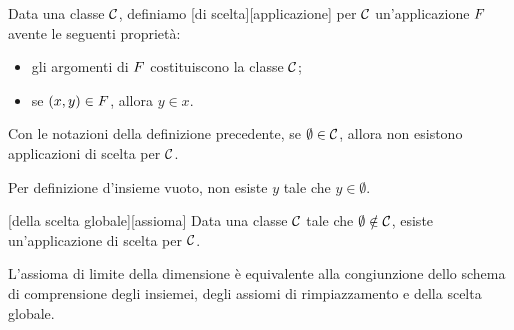 \begin{Definition}
	Data una classe $\mathcal{C}$, definiamo [di scelta][applicazione] per $\mathcal{C}$ un'applicazione $F$ avente le seguenti propriet\`a:
	\begin{itemize}
		\item gli argomenti di $F$ costituiscono la classe $\mathcal{C}$;
		\item se $(x,y) \in F$, allora $y \in x$.
	\end{itemize}
\end{Definition}
\begin{Theorem}
	Con le notazioni della definizione precedente, se $\emptyset \in \mathcal{C}$, allora non esistono applicazioni di scelta per $\mathcal{C}$.
\end{Theorem}
\Proof Per definizione d'insieme vuoto, non esiste $y$ tale che $y \in \emptyset$. \EndProof
\begin{Axiom}
	[della scelta globale][assioma] Data una classe $\mathcal{C}$ tale che $\emptyset \notin \mathcal{C}$, esiste un'applicazione di scelta per $\mathcal{C}$.
\end{Axiom}
\begin{Theorem}
	L'assioma di limite della dimensione \`e equivalente alla congiunzione dello schema di comprensione degli insiemei, degli assiomi di rimpiazzamento e della scelta globale.
\end{Theorem}
